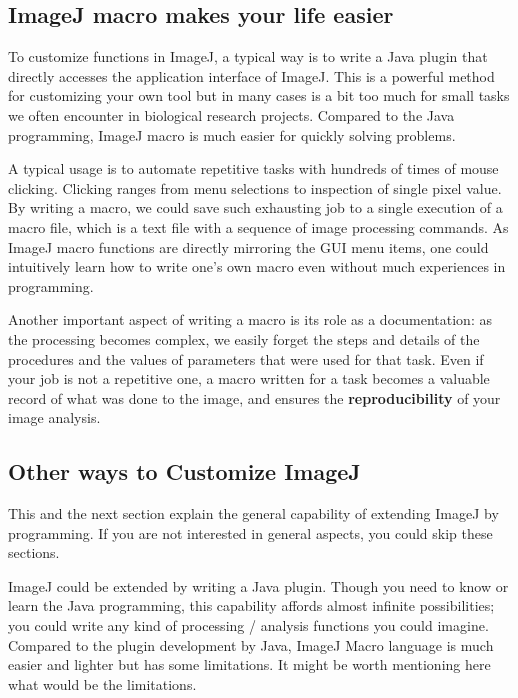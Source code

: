 

\subsection{ImageJ macro makes your life easier}

To customize functions in ImageJ, a typical way is to write a Java plugin that directly accesses the application interface of ImageJ. 
This is a powerful method for customizing your own tool but in many cases is a bit too much for small tasks we often encounter in biological research projects. Compared to the Java programming, ImageJ macro is much easier for quickly solving problems.

A typical usage is to automate repetitive tasks with hundreds of times of mouse clicking. Clicking ranges from menu selections to inspection of single pixel value. By writing a macro, we could save such exhausting job to a single execution of a macro file, which is a text file with a sequence of image processing commands. As ImageJ macro functions are directly mirroring the GUI menu items, one could intuitively learn how to write one's own macro even without much experiences in programming.

Another important aspect of writing a macro is its role as a documentation: as the processing becomes complex, we easily forget the steps and details of the procedures and the values of parameters that were used for that task. Even if your job is not a repetitive one, a macro written for a task becomes a valuable record of what was done to the image, and ensures the \textbf{reproducibility} of your image analysis.  

\subsection{Other ways to Customize ImageJ}

This and the next section explain the general capability of extending ImageJ by programming. If you are not interested in general aspects, you could skip these sections.  

ImageJ could be extended by writing a Java plugin. Though you need to know or learn the Java programming,  this capability affords almost infinite possibilities;  you could write any kind of processing / analysis functions you could imagine. Compared to the plugin development by Java, ImageJ Macro language is much easier and lighter but has some limitations. It might be worth mentioning here what would be the limitations. 

